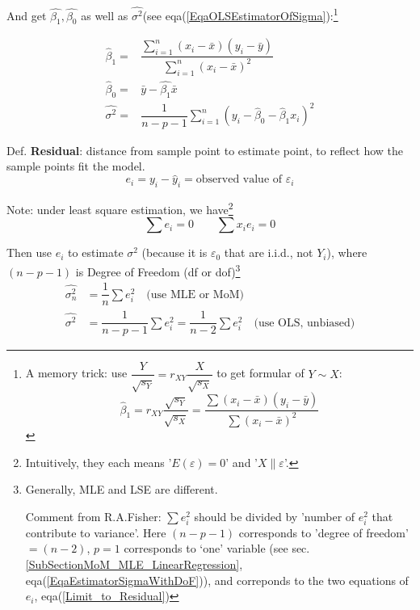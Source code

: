     
    And get $ \hat{\beta _1},\hat{\beta _0}$ as well as $ \hat{\sigma^2} $(see eqa(\ref{EqaOLSEstimatorOfSigma}):\footnote{A memory trick: use $ \dfrac{Y}{\sqrt{s_Y}}=r_{XY}\dfrac{X}{\sqrt{s_X}} $ to get formular of $ Y\sim X $:
    \begin{equation}
        \hat{\beta }_1=r_{XY}\dfrac{\sqrt{s_Y}}{\sqrt{s_X}}=\dfrac{{\displaystyle\sum (x_i-\bar{x})(y_i-\bar{y})}}{{\displaystyle\sum (x_i-\bar{x})^2}} 
    \end{equation}}

\begin{equation}\label{EqaOLSEstimatorOfBeta}
    \begin{aligned}
        \hat{\beta }_1=&\dfrac{\sum\limits_{i=1}^n (x_i-\bar{x})(y_i-\bar{y})}{\sum\limits_{i=1}^n (x_i-\bar{x})^2}\\
        \hat{\beta }_0=&\bar{y}-\hat{\beta _1}\bar{x}\\
        \hat{\sigma^2}=&\dfrac{1}{n-p-1}\sum_{i=1}^n(y_i-\hat{\beta }_0-\hat{\beta }_1x_i)^2
    \end{aligned}
\end{equation}


    
    Def. \textbf{Residual}: distance from sample point to estimate point, to reflect how the sample points fit the model.
    \begin{equation}
        e_i=y_i-\hat{y}_i=\text{observed value of }\varepsilon _i 
    \end{equation}
    
    Note: under least square estimation, we have\footnote{Intuitively, they each means '$ E(\varepsilon )=0 $' and '$ X\parallel \varepsilon  $'.}
\begin{equation}\label{Limit_to_Residual}
        \sum e_i=0\qquad \sum x_ie_i=0 
\end{equation}
    

    Then use $ e_i $ to estimate $ \sigma ^2 $ (because it is $ \varepsilon _0 $ that are i.i.d., not $ Y_i $), where $ (n-p-1) $ is Degree of Freedom (df or dof)\footnote{Generally, MLE and LSE are different.

    Comment from R.A.Fisher: $ \sum e_i^2 $ should be divided by 'number of $ e_i^2 $ that contribute to variance'. Here $ (n-p-1) $ corresponds to 'degree of freedom' $ =(n-2) $, $ p=1 $ corresponds to `one' variable (see sec.\ref{SubSectionMoM_MLE_LinearRegression}, eqa(\ref{EqaEstimatorSigmaWithDoF})), and correponds to the two equations of $ e_i $, eqa(\ref{Limit_to_Residual})}
\begin{equation}\label{EqaOLSEstimatorOfSigma}
    \begin{aligned}
        \hat{\sigma _n^2}&=\dfrac{1}{n}\sum e_i^2 \quad\text{(use MLE or MoM)}\\
        \hat{\sigma^2}&=\dfrac{1}{n-p-1}\sum e_i^2=\dfrac{1}{n-2}\sum e_i^2\quad\text{(use OLS, unbiased)}
\end{aligned}
\end{equation}

